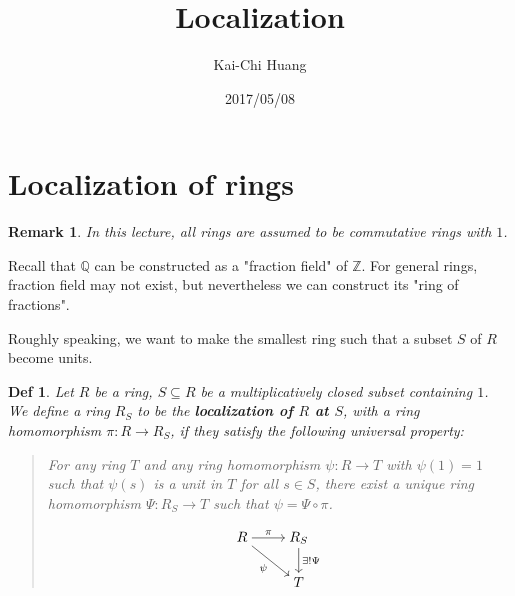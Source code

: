 \documentclass[a4paper]{article}
\title{\bf Localization}
\author{Kai-Chi Huang}
\date{2017/05/08}
\newcommand*{\Zb}{\mathbb{Z}}
\newcommand*{\Qb}{\mathbb{Q}}
\theoremstyle{mystyle}
\newtheorem{remark}{Remark}
\newtheorem{definition}{Def}
\begin{document}
\maketitle
\section{Localization of rings}

\begin{remark}
  In this lecture, all rings are assumed to be commutative rings with $1$.
\end{remark}

Recall that $\Qb$ can be constructed as a "fraction field" of $\Zb$.
For general rings, fraction field may not exist, but nevertheless we can
construct its "ring of fractions".

Roughly speaking, we want to make the smallest ring such that a subset $S$ of $R$ become units.

\begin{definition}
  Let $R$ be a ring, $S \subseteq R$ be a multiplicatively
  closed subset containing $1$. 
  We define a ring $R_S$ to be the {\bf localization of $R$ at $S$}, 
  with a ring homomorphism $\pi : R \to R_S$, if they  
  satisfy the following universal property:
  \begin{quote}
    For any ring $T$ and any ring homomorphism $\psi : R \to T$ with
    $\psi(1) = 1$ such that $\psi(s)$ is a unit in $T$ for all $s \in S$,
    there exist a unique ring homomorphism $\Psi : R_S \to T$
    such that $\psi = \Psi \circ \pi$.

    \[
      \begin{tikzcd}[cramped]
        R \arrow{r}{\pi} \arrow[swap]{dr}{\psi} & R_S \arrow{d}{\exists! \Psi} \\
         & T
      \end{tikzcd}
    \]

  \end{quote}
\end{definition}
\end{document}
